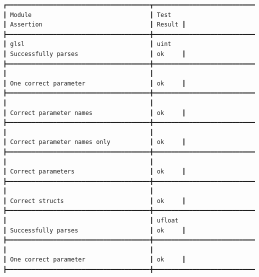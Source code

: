 \documentclass[12pt,twoside,notitlepage]{report}
\begin{document}
\begin{listing}[H]
{\tiny
\begin{verbatim}
┏━━━━━━━━━━━━━━━━━━━━━━━━━━━━━━━━━━━━━━━━┳━━━━━━━━━━━━━━━━━━━━━━━━━━━━━━━━━━━━━━━━┳━━━━━━━━━━━━━━━━━━━━━━━━━━━━━━━━━━━━━━━━┳━━━━━━━━┓
┃ Module                                 ┃ Test                                   ┃ Assertion                              ┃ Result ┃
┣━━━━━━━━━━━━━━━━━━━━━━━━━━━━━━━━━━━━━━━━╋━━━━━━━━━━━━━━━━━━━━━━━━━━━━━━━━━━━━━━━━╋━━━━━━━━━━━━━━━━━━━━━━━━━━━━━━━━━━━━━━━━╋━━━━━━━━┫
┃ glsl                                   ┃ uint                                   ┃ Successfully parses                    ┃ ok     ┃
┣━━━━━━━━━━━━━━━━━━━━━━━━━━━━━━━━━━━━━━━━╋━━━━━━━━━━━━━━━━━━━━━━━━━━━━━━━━━━━━━━━━╋━━━━━━━━━━━━━━━━━━━━━━━━━━━━━━━━━━━━━━━━╋━━━━━━━━┫
┃                                        ┃                                        ┃ One correct parameter                  ┃ ok     ┃
┣━━━━━━━━━━━━━━━━━━━━━━━━━━━━━━━━━━━━━━━━╋━━━━━━━━━━━━━━━━━━━━━━━━━━━━━━━━━━━━━━━━╋━━━━━━━━━━━━━━━━━━━━━━━━━━━━━━━━━━━━━━━━╋━━━━━━━━┫
┃                                        ┃                                        ┃ Correct parameter names                ┃ ok     ┃
┣━━━━━━━━━━━━━━━━━━━━━━━━━━━━━━━━━━━━━━━━╋━━━━━━━━━━━━━━━━━━━━━━━━━━━━━━━━━━━━━━━━╋━━━━━━━━━━━━━━━━━━━━━━━━━━━━━━━━━━━━━━━━╋━━━━━━━━┫
┃                                        ┃                                        ┃ Correct parameter names only           ┃ ok     ┃
┣━━━━━━━━━━━━━━━━━━━━━━━━━━━━━━━━━━━━━━━━╋━━━━━━━━━━━━━━━━━━━━━━━━━━━━━━━━━━━━━━━━╋━━━━━━━━━━━━━━━━━━━━━━━━━━━━━━━━━━━━━━━━╋━━━━━━━━┫
┃                                        ┃                                        ┃ Correct parameters                     ┃ ok     ┃
┣━━━━━━━━━━━━━━━━━━━━━━━━━━━━━━━━━━━━━━━━╋━━━━━━━━━━━━━━━━━━━━━━━━━━━━━━━━━━━━━━━━╋━━━━━━━━━━━━━━━━━━━━━━━━━━━━━━━━━━━━━━━━╋━━━━━━━━┫
┃                                        ┃                                        ┃ Correct structs                        ┃ ok     ┃
┣━━━━━━━━━━━━━━━━━━━━━━━━━━━━━━━━━━━━━━━━╋━━━━━━━━━━━━━━━━━━━━━━━━━━━━━━━━━━━━━━━━╋━━━━━━━━━━━━━━━━━━━━━━━━━━━━━━━━━━━━━━━━╋━━━━━━━━┫
┃                                        ┃ ufloat                                 ┃ Successfully parses                    ┃ ok     ┃
┣━━━━━━━━━━━━━━━━━━━━━━━━━━━━━━━━━━━━━━━━╋━━━━━━━━━━━━━━━━━━━━━━━━━━━━━━━━━━━━━━━━╋━━━━━━━━━━━━━━━━━━━━━━━━━━━━━━━━━━━━━━━━╋━━━━━━━━┫
┃                                        ┃                                        ┃ One correct parameter                  ┃ ok     ┃
┣━━━━━━━━━━━━━━━━━━━━━━━━━━━━━━━━━━━━━━━━╋━━━━━━━━━━━━━━━━━━━━━━━━━━━━━━━━━━━━━━━━╋━━━━━━━━━━━━━━━━━━━━━━━━━━━━━━━━━━━━━━━━╋━━━━━━━━┫

\end{verbatim}}
\end{listing}
\end{document}
